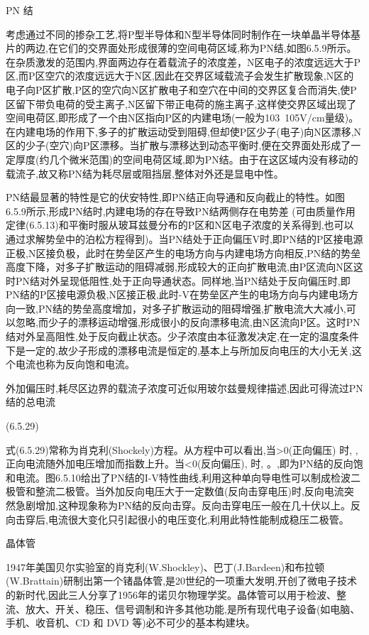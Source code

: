 PN 结

考虑通过不同的掺杂工艺,将P型半导体和N型半导体同时制作在一块单晶半导体基片的两边,在它们的交界面处形成很薄的空间电荷区域,称为PN结,如图6.5.9所示。在杂质激发的范围内,界面两边存在着载流子的浓度差，N区电子的浓度远远大于P区,而P区空穴的浓度远远大于N区,因此在交界区域载流子会发生扩散现象,N区的电子向P区扩散,P区的空穴向N区扩散电子和空穴在中间的交界区复合而消失,使P区留下带负电荷的受主离子,N区留下带正电荷的施主离子,这样使交界区域出现了空间电荷区,即形成了一个由N区指向P区的内建电场(一般为103~105V/cm量级)。在内建电场的作用下,多子的扩散运动受到阻碍,但却使P区少子(电子)向N区漂移,N区的少子(空穴)向P区漂移。当扩散与漂移达到动态平衡时,便在交界面处形成了一定厚度(约几个微米范围)的空间电荷区域,即为PN结。由于在这区域内没有移动的载流子,故又称PN结为耗尽层或阻挡层,整体对外还是显电中性。



PN结最显著的特性是它的伏安特性,即PN结正向导通和反向截止的特性。如图6.5.9所示,形成PN结时,内建电场的存在导致PN结两侧存在电势差 (可由质量作用定律(6.5.13)和平衡时服从玻耳兹曼分布的P区和N区电子浓度的关系得到,也可以通过求解势垒中的泊松方程得到)。当PN结处于正向偏压V时,即PN结的P区接电源正极,N区接负极，此时在势垒区产生的电场方向与内建电场方向相反,PN结的势垒高度下降，对多子扩散运动的阻碍减弱,形成较大的正向扩散电流,由P区流向N区这时PN结对外呈现低阻性,处于正向导通状态。同样地,当PN结处于反向偏压时,即PN结的P区接电源负极,N区接正极,此时-V在势垒区产生的电场方向与内建电场方向一致,PN结的势垒高度增加，对多子扩散运动的阻碍增强,扩散电流大大减小,可以忽略,而少子的漂移运动增强,形成很小的反向漂移电流,由N区流向P区。这时PN结对外呈高阻性,处于反向截止状态。少子浓度由本征激发决定,在一定的温度条件下是一定的,故少子形成的漂移电流是恒定的,基本上与所加反向电压的大小无关,这个电流也称为反向饱和电流。

外加偏压时,耗尽区边界的载流子浓度可近似用玻尔兹曼规律描述,因此可得流过PN结的总电流

 	(6.5.29)

式(6.5.29)常称为肖克利(Shockely)方程。从方程中可以看出,当>0(正向偏压) 时, ,正向电流随外加电压增加而指数上升。当<0(反向偏压), 时, 。,即为PN结的反向饱和电流。图6.5.10给出了PN结的I-V特性曲线,利用这种单向导电性可以制成检波二极管和整流二极管。当外加反向电压大于一定数值(反向击穿电压)时,反向电流突然急剧增加,这种现象称为PN结的反向击穿。反向击穿电压一般在几十伏以上。反向击穿后,电流很大变化只引起很小的电压变化,利用此特性能制成稳压二极管。



晶体管

1947年美国贝尔实验室的肖克利(W.Shockley)、巴丁(J.Bardeen)和布拉顿(W.Brattain)研制出第一个锗晶体管,是20世纪的一项重大发明,开创了微电子技术的新时代,因此三人分享了1956年的诺贝尔物理学奖。晶体管可以用于检波、整流、放大、开关、稳压、信号调制和许多其他功能,是所有现代电子设备(如电脑、手机、收音机、CD 和 DVD 等)必不可少的基本构建块。

